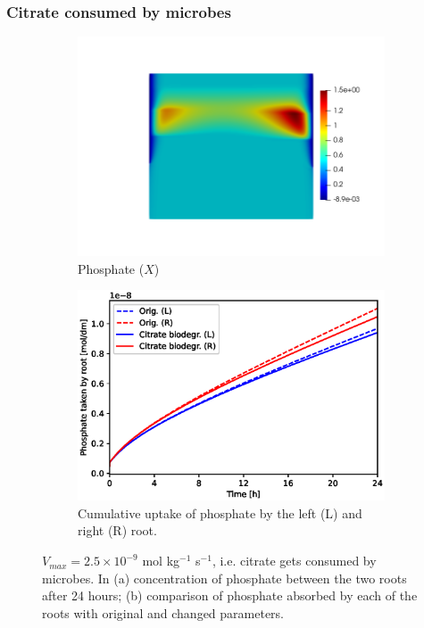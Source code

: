 \documentclass[11pt]{article}
\begin{document}
\subsubsection{Citrate consumed by microbes}
\begin{figure}[!htb]
\centering
\begin{subfigure}[t]{0.45\textwidth}
    \includegraphics[trim= 100 100 60 100,width=\textwidth]{Figures/X_citrateVmaxnonzero.png}
    \caption{Phosphate ($X$)}
\end{subfigure}
\qquad
\begin{subfigure}[t]{0.45\textwidth}
    \includegraphics[width=\textwidth]{Figures/citratevmaxnonzero.eps}
    \caption{Cumulative uptake of phosphate by the left (L) and right (R) root.}
\end{subfigure}

\caption{$V_{max} = 2.5 \times 10^{-9}$ mol kg$^{-1}$ s$^{-1}$, i.e. citrate gets consumed by microbes. In (a) concentration of phosphate between the two roots after 24 hours; (b) comparison of phosphate absorbed by each of the roots with original and changed parameters.}
\end{figure}
\end{document}
